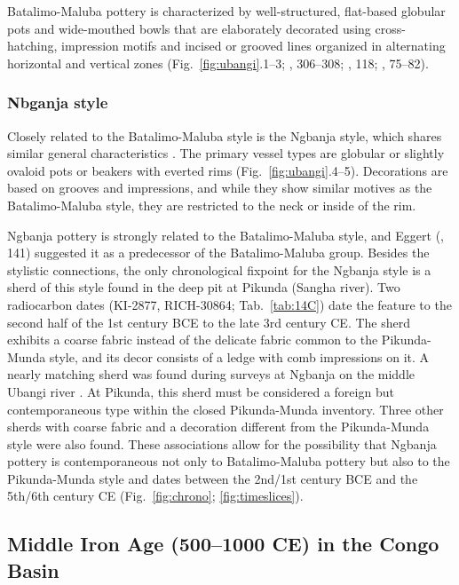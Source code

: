 \documentclass[smallextended,natbib]{svjour3}       %
\begin{document}
Batalimo-Maluba pottery is characterized by well-structured, flat-based globular pots and wide-mouthed bowls that are elaborately decorated using cross-hatching, impression motifs and incised or grooved lines organized in alternating horizontal and vertical zones (Fig.~\ref{fig:ubangi}.1--3; \citeauthor{Eggert.1993} \citeyear{Eggert.1993}, 306--308; \citeauthor{Seidensticker.2016b} \citeyear{Seidensticker.2016b}, 118; \citeyear{Seidensticker.2021e}, 75--82).

\subsubsection*{Nbganja style}

Closely related to the Batalimo-Maluba style is the Ngbanja style, which shares similar general characteristics \citep[82--86]{Seidensticker.2021e}. The primary vessel types are globular or slightly ovaloid pots or beakers with everted rims (Fig.~\ref{fig:ubangi}.4--5). Decorations are based on grooves and impressions, and while they show similar motives as the Batalimo-Maluba style, they are restricted to the neck or inside of the rim.

Ngbanja pottery is strongly related to the Batalimo-Maluba style, and Eggert (\citeyear{Eggert.1987c}, 141) suggested it as a predecessor of the Batalimo-Maluba group. Besides the stylistic connections, the only chronological fixpoint for the Ngbanja style is a sherd of this style found in the deep pit at Pikunda (Sangha river). Two radiocarbon dates (KI-2877, RICH-30864; Tab.~\ref{tab:14C}) date the feature to the second half of the 1st century BCE to the late 3rd century CE. The sherd exhibits a coarse fabric instead of the delicate fabric common to the Pikunda-Munda style, and its decor consists of a ledge with comb impressions on it. A nearly matching sherd was found during surveys at Ngbanja on the middle Ubangi river \citep[83 Fig.~26.7--8]{Seidensticker.2021e}. At Pikunda, this sherd must be considered a foreign but contemporaneous type within the closed Pikunda-Munda inventory. Three other sherds with coarse fabric and a decoration different from the Pikunda-Munda style were also found. These associations allow for the possibility that Ngbanja pottery is contemporaneous not only to Batalimo-Maluba pottery but also to the Pikunda-Munda style and dates between the 2nd/1st century BCE and the 5th/6th century CE (Fig.~\ref{fig:chrono}; \ref{fig:timeslices}).

\subsection*{Middle Iron Age (500--1000 CE) in the Congo Basin}
\end{document}
